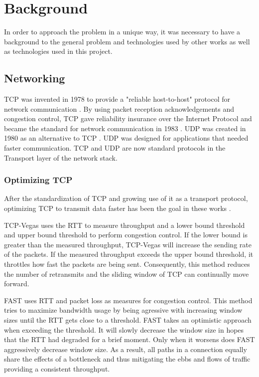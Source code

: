 \chapter{Background}

In order to approach the problem in a unique way, it was necessary to have a background to the general problem and technologies used by other works as well as technologies used in this project.

\section{Networking}

TCP was invented in 1978 to provide a "reliable host-to-host" protocol for network communication \cite{cerf1978specification}. By using packet reception acknowledgements and congestion control, TCP gave reliability insurance over the Internet Protocol and became the standard for network communication in 1983 \cite{andrews2013who}. UDP was created in 1980 as an alternative to TCP \cite{postel1980user}\cite{kozierokr2005udp}. UDP was designed for applications that needed faster communication. TCP and UDP are now standard protocols in the Transport layer of the network stack.

\subsection{Optimizing TCP}

After the standardization of TCP and growing use of it as a transport protocol, optimizing TCP to transmit data faster has been the goal in these works \cite{brakmo1995tcp}\cite{wei2006fast}\cite{ha2008cubic}. 

TCP-Vegas \cite{brakmo1995tcp} uses the RTT to measure throughput and a lower bound threshold and upper bound threshold to perform congestion control. If the lower bound is greater than the measured throughput, TCP-Vegas will increase the sending rate of the packets. If the measured throughput exceeds the upper bound threshold, it throttles how fast the packets are being sent. Consequently, this method reduces the number of retransmits and the sliding window of TCP can continually move forward.

FAST \cite{wei2006fast} uses RTT and packet loss as measures for congestion control. This method tries to maximize bandwidth usage by being agressive with increasing window sizes until the RTT gets close to a threshold. FAST takes an optimistic approach when exceeding the threshold. It will slowly decrease the window size in hopes that the RTT had degraded for a brief moment. Only when it worsens does FAST aggressively decrease window size. As a result, all paths in a connection equally share the effects of a bottleneck and thus mitigating the ebbs and flows of traffic providing a consistent throughput.

